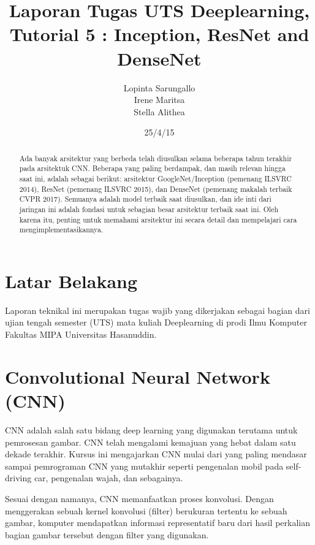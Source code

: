 \documentclass[peerreview]{IEEEtran}
\begin{document}
\title{Laporan Tugas UTS Deeplearning, Tutorial 5 : Inception, ResNet and DenseNet}

\author{Lopinta Sarungallo\\
Irene Maritsa\\
Stella Alithea}
\date{25/4/15}

\maketitle
\tableofcontents
\listoffigures
\listoftables

\IEEEpeerreviewmaketitle
\begin{abstract}
Ada banyak arsitektur yang berbeda telah diusulkan selama beberapa tahun terakhir pada arsitektuk CNN. Beberapa yang paling berdampak, dan masih relevan hingga saat ini, adalah sebagai berikut: arsitektur GoogleNet/Inception (pemenang ILSVRC 2014), ResNet (pemenang ILSVRC 2015), dan DenseNet (pemenang makalah terbaik CVPR 2017). Semuanya adalah model terbaik saat diusulkan, dan ide inti dari jaringan ini adalah fondasi untuk sebagian besar arsitektur terbaik saat ini. Oleh karena itu, penting untuk memahami arsitektur ini secara detail dan mempelajari cara mengimplementasikannya.
\end{abstract}


\section{Latar Belakang}
Laporan teknikal ini merupakan tugas wajib yang dikerjakan sebagai bagian dari ujian tengah semester (UTS) mata kuliah Deeplearning di prodi Ilmu Komputer Fakultas MIPA Universitas Hasanuddin.

\section{Convolutional Neural Network (CNN)}
CNN adalah salah satu bidang deep learning yang digunakan terutama untuk pemrosesan gambar. CNN telah mengalami kemajuan yang hebat dalam satu dekade terakhir. Kursus ini mengajarkan CNN mulai dari yang paling mendasar sampai pemrograman CNN yang mutakhir seperti pengenalan mobil pada self-driving car, pengenalan wajah, dan sebagainya.

Sesuai dengan namanya, CNN memanfaatkan proses konvolusi. Dengan menggerakan sebuah kernel konvolusi (filter) berukuran tertentu ke sebuah gambar, komputer mendapatkan informasi representatif baru dari hasil perkalian bagian gambar tersebut dengan filter yang digunakan.
\end{document}
